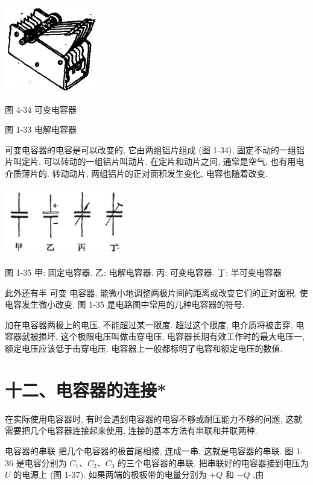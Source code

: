 \documentclass[10pt]{article}
\begin{document}
\begin{center}
\includegraphics[max width=0.3\textwidth]{images/01913056-1f15-74d8-9184-9aab52c9d66b_47_445999.jpg}
\end{center}

图 4-34 可变电容器

图 1-33 电解电容器

可变电容器的电容是可以改变的, 它由两组铝片组成 (图 1-34), 固定不动的一组铝片叫定片, 可以转动的一组铝片叫动片. 在定片和动片之间, 通常是空气, 也有用电介质薄片的. 转动动片, 两组铝片的正对面积发生变化, 电容也随着改变.

\begin{center}
\includegraphics[max width=0.4\textwidth]{images/01913056-1f15-74d8-9184-9aab52c9d66b_48_469817.jpg}
\end{center}

图 1-35 甲: 固定电容器. 乙: 电解电容器. 丙: 可变电容器. 丁: 半可变电容器

此外还有半 可变 电容器, 能微小地调整两极片间的距离或改变它们的正对面积, 使电容发生微小改变. 图 1-35 是电路图中常用的儿种电容器的符号.

加在电容器两极上的电压, 不能超过某一限度. 超过这个限度, 电介质将被击穿, 电容器就被损坏, 这个极限电压叫做击穿电压, 电容器长期有效工作时的最大电压一, 额定电压应该低于击穿电压. 电容器上一般都标明了电容和额定电压的数值.

\section*{十二、电容器的连接*}

在实际使用电容器时, 有时会遇到电容器的电容不够或耐压能力不够的问题, 这就需要把几个电容器连接起来使用, 连接的基本方法有串联和并联两种.

电容器的串联 把几个电容器的极首尾相接, 连成一串, 这就是电容器的串联. 图 1-36 是电容分别为 \({C}_{1}\text{、}{C}_{2}\text{、}{C}_{3}\) 的三个电容器的串联. 把串联好的电容器接到电压为 \(U\) 的电源上 (图 1-37). 如果两端的极板带的电量分别为 \(+ Q\) 和 \(- Q\) ,由
\end{document}
